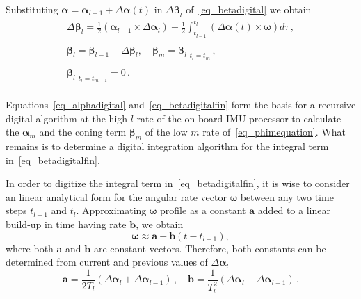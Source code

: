 \documentclass[journal]{IEEEtran}
\begin{document}
Substituting $\boldsymbol{\alpha} = \boldsymbol{\alpha}_{l-1}+\Delta\boldsymbol{\alpha}(t)$ in $\Delta\boldsymbol{\beta}_l$ of~\eqref{eq_betadigital} we obtain 
\begin{equation}\label{eq_betadigitalfin}
\begin{array}{c}
\Delta\boldsymbol{\beta}_l =\frac{1}{2}\left(\boldsymbol{\alpha}_{l-1}\times\Delta\boldsymbol{\alpha}_l\right)+\frac{1}{2} \int_{t_{l-1}}^{t_l}\left(\Delta\boldsymbol{\alpha}(t)\times\boldsymbol{\omega}\right)d\tau\,,\\
\\
\boldsymbol{\beta}_l = \boldsymbol{\beta}_{l-1}+\Delta\boldsymbol{\beta}_l, \quad   \boldsymbol{\beta}_m = \boldsymbol{\beta}_l\bigg\rvert_{t_l=t_m}\,,\\
\\
\boldsymbol{\beta}_l\bigg\rvert_{{t_l=t_{m-1}}} = 0\,.\\
\end{array}
\end{equation}

Equations~\eqref{eq_alphadigital} and~\eqref{eq_betadigitalfin} form the basis for a recursive digital algorithm at the high $l$ rate of the on-board IMU processor  to calculate the $\boldsymbol{\alpha}_m$ and the coning term $\boldsymbol{\beta}_m$ of the low $m$ rate  of~\eqref{eq_phimequation}. What remains is to determine a digital integration algorithm for the integral term in~\eqref{eq_betadigitalfin}.

In order to digitize the integral term in~\eqref{eq_betadigitalfin}, it is wise to consider an linear analytical form for the angular rate vector $\boldsymbol\omega$ between any two time steps $t_{l-1}$ and $t_l$. Approximating $\boldsymbol\omega$ profile as a constant $\boldsymbol{a}$ added to a linear build-up in time having rate $\boldsymbol{b}$, we obtain
\begin{equation}\label{eq_omega}
    \boldsymbol\omega \approx \boldsymbol{a} + \boldsymbol{b}(t-t_{l-1}), 
\end{equation}
where both $\boldsymbol{a}$ and  $\boldsymbol{b}$ are constant vectors. Therefore, both constants can  be determined from current and previous values of $\Delta\boldsymbol{\alpha}_l$
\begin{equation}\label{eq_AB}
    \boldsymbol{a} =\frac{1}{2T_l} \left(\Delta\boldsymbol{\alpha}_l+\Delta\boldsymbol{\alpha}_{l-1} \right)\,,\quad \boldsymbol{b} =\frac{1}{T_{l}^{2}} \left(\Delta\boldsymbol{\alpha}_l-\Delta\boldsymbol{\alpha}_{l-1}   \right)\,.
\end{equation}
\end{document}
